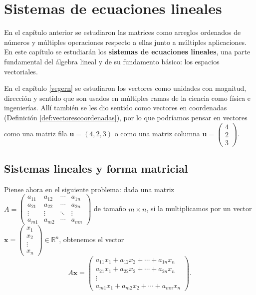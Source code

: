 \chapter{Sistemas de ecuaciones lineales}\label{sel}

En el capítulo anterior se estudiaron las matrices como arreglos ordenados de números y múltiples operaciones respecto a ellas junto a múltiples aplicaciones. En este capítulo se estudiarán los \textbf{sistemas de ecuaciones lineales}, una parte fundamental del álgebra lineal y de su fundamento básico: los espacios vectoriales.

En el capítulo \ref{vegern} se estudiaron los vectores como unidades con magnitud, dirección y sentido que son usados en múltiples ramas de la ciencia como física e ingenierías. Allí también se les dio sentido como vectores en coordenadas (Definición \ref{def:vectorescoordenadas}), por lo que podríamos pensar en vectores como una matriz fila $\mathbf{u}=(4,2,3)$ o como una matriz columna $\mathbf{u}=\begin{pmatrix}4\\2\\3\end{pmatrix}$. 

\section{Sistemas lineales y forma matricial}

Piense ahora en el siguiente problema: dada una matriz $A=\begin{pmatrix}a_{11}&a_{12}&\cdots &a_{1n}\\a_{21}&a_{22}&\cdots &a_{2n}\\ \vdots&\vdots&\ddots &\vdots\\ a_{m1}&a_{m2}&\cdots &a_{mn}\end{pmatrix}$ de tamaño $m\times n$, si la multiplicamos por un vector $\mathbf{x}=\begin{pmatrix}x_1\\x_2\\\vdots\\ x_n \end{pmatrix} \in \mathbb{R}^n$, obtenemos el vector 
\begin{equation*}
A\mathbf{x} = \begin{pmatrix} a_{11}x_1+a_{12}x_2+\cdots + a_{1n}x_n\\a_{21}x_1+a_{22}x_2+\cdots + a_{2n}x_n\\\vdots \\ a_{m1}x_1+a_{m2}x_2+\cdots + a_{mn}x_n\end{pmatrix}.
\end{equation*}

